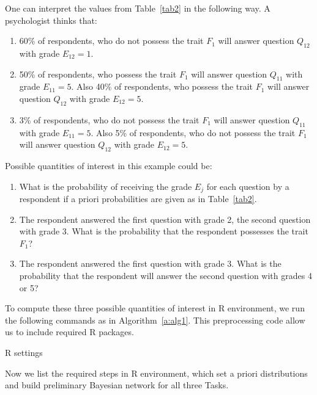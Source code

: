 \documentclass[12pt]{article}
\begin{document}
%
One can interpret the values from Table~\ref{tab2} in the following way.  A psychologist thinks that:
\begin{enumerate}
\item 60\%
of respondents, who do not possess the trait $F_1$ will answer question $Q_{12}$ with grade $E_{12}=1$.
\item 50\% of respondents, who possess the trait $F_1$ will answer question $Q_{11}$ with grade $E_{11}=5$. Also 40\% of respondents, who possess the trait $F_1$ will answer question $Q_{12}$ with grade $E_{12}=5$. 
\item 3\% of respondents, who do not possess the trait $F_1$ will answer question $Q_{11}$ with grade $E_{11}=5$. Also 5\% of respondents, who do not possess the trait $F_1$ will answer question $Q_{12}$ with grade $E_{12}=5$.
\end{enumerate}	
	
Possible quantities of interest in this example could be: 
\begin{enumerate}
\item What is the probability of receiving the grade $E_j$ for each question by a respondent if a priori probabilities are given as in Table~\ref{tab2}.  
\item The respondent answered the first question with grade 2, the second question with grade 3. What is the probability that the respondent possesses the trait $F_1$?
\item The respondent answered the first question with grade 3. What is the probability that the respondent will answer the second question with grades 4 or 5?
\end{enumerate}	
%
%
To compute these three possible quantities of interest in R environment, we run the following commands as in Algorithm~\ref{a:alg1}. This preprocessing code allow us to include required R packages.
%
\begin{algorithm}
\begin{small}
\caption{R settings}
\label{a:alg1}
\begin{algorithmic}
\State {}
\State {}
\State {}
\State {}
\State {}
\State {}
\State {}
\State {}
\State {}
\State {}
\State {}
\State {}
\end{algorithmic}
\end{small}
\end{algorithm}
%
Now we list the required steps in R environment, which set a priori distributions and build preliminary Bayesian network for all three Tasks.
\end{document}
